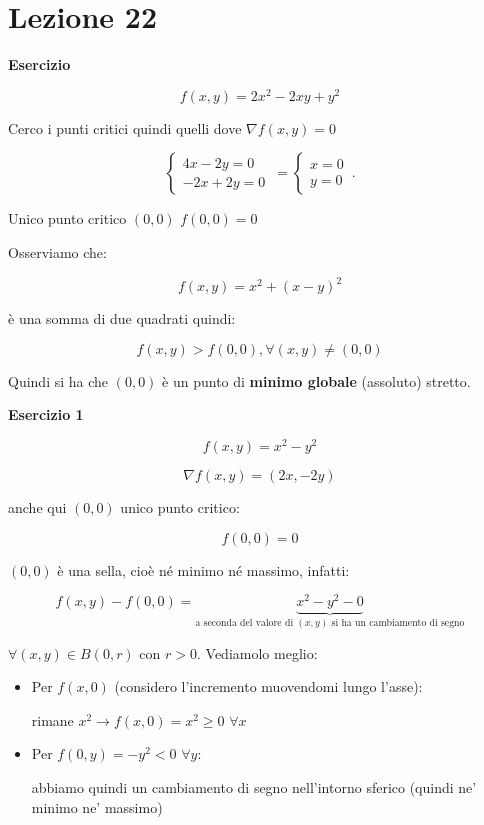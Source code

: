 \documentclass[../appunti-analisi.tex]{subfiles}
\begin{document}
\section{Lezione 22}

\textbf{Esercizio}

\[
    f(x,y) = 2x^{2} - 2xy +y^{2}
\]

Cerco i punti critici quindi quelli dove $\nabla f(x,y) = 0$

\[
    \begin{cases}
           4x -2y = 0\\
           -2x +2y = 0
    \end{cases}\, =
    \begin{cases}
           x= 0\\
           y = 0
    \end{cases}\,.
\]

Unico punto critico $(0,0)$ $f(0,0)=0$

Osserviamo che:

\[
    f(x,y) = x^{2} + (x-y)^{2}
\]

è una somma di due quadrati quindi:

\[
    f(x,y) > f(0,0),\forall (x,y) \neq (0,0)
\]

Quindi si ha che $(0,0)$ è  un punto di \textbf{minimo globale} (assoluto) stretto.


\textbf{Esercizio 1} 

\[
    f(x,y) = x^{2}-y^{2}
\]

\[
    \nabla f(x,y) = (2x, -2y)
\]

anche qui $(0,0)$ unico punto critico:

\[
    f(0,0) = 0
\]

$(0,0)$ è una sella, cioè né minimo né massimo, infatti:

\[
    f(x,y) - f(0,0) = \underbrace{x^{2}-y^{2}-0}_\text{a seconda del valore di $(x,y)$ si ha un cambiamento di segno}
\]

$\forall (x,y) \in B(0,r)$ con $r>0$. Vediamolo meglio:

\begin{itemize}
    \item Per $f(x,0)$ (considero l'incremento muovendomi lungo l'asse):

        rimane $x^{2} \rightarrow  f(x,0)=x^{2}\ge 0$ $\forall x$
    \item Per $f(0,y) = -y^{2} <0$ $\forall y$:

        abbiamo quindi un cambiamento di segno nell'intorno sferico (quindi ne' minimo ne' massimo)
\end{itemize}
\end{document}
